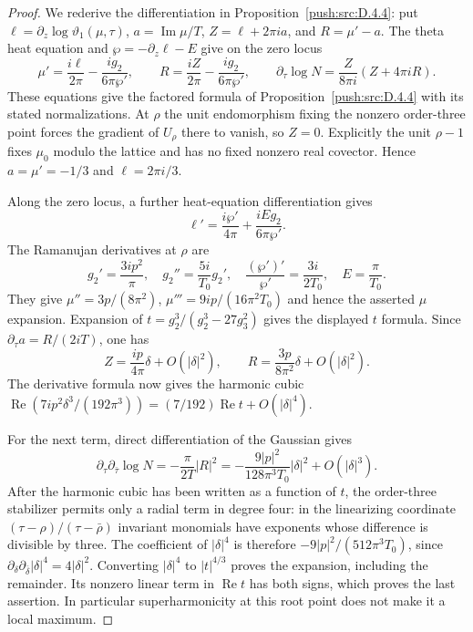 \begin{proof}
We rederive the differentiation in Proposition~\ref{push:src:D.4.4}: put
$\ell=\partial_z\log\vartheta_1(\mu,\tau)$,
$a=\operatorname{Im}\mu/T$, $Z=\ell+2\pi ia$, and
$R=\mu'-a$. The theta heat equation and
$\wp=-\partial_z\ell-E$ give on the zero locus
\[
 \mu'=\frac{i\ell}{2\pi}-\frac{ig_2}{6\pi\wp'},\qquad
 R=\frac{iZ}{2\pi}-\frac{ig_2}{6\pi\wp'},\qquad
 \partial_\tau\log N=\frac{Z}{8\pi i}(Z+4\pi iR).
\]
These equations give the factored formula of Proposition~\ref{push:src:D.4.4}
with its stated normalizations. At $\rho$ the unit endomorphism fixing the
nonzero order-three point forces the gradient of $U_\rho$ there to
vanish, so $Z=0$. Explicitly the unit $\rho-1$ fixes $\mu_0$ modulo
the lattice and has no fixed nonzero real covector. Hence
$a=\mu'=-1/3$ and $\ell=2\pi i/3$.

Along the zero locus, a further heat-equation differentiation gives
\[
 \ell'=\frac{i\wp'}{4\pi}+\frac{iEg_2}{6\pi\wp'}.
\]
The Ramanujan derivatives at $\rho$ are
\[
 g_2'=\frac{3ip^2}{\pi},\quad
 g_2''=\frac{5i}{T_0}g_2',\quad
 \frac{(\wp')'}{\wp'}=\frac{3i}{2T_0},\quad E=\frac\pi{T_0}.
\]
They give $\mu''=3p/(8\pi^2)$,
$\mu'''=9ip/(16\pi^2T_0)$ and hence the asserted $\mu$ expansion.
Expansion of $t=g_2^3/(g_2^3-27g_3^2)$ gives the displayed $t$
formula. Since $\partial_\tau a=R/(2iT)$, one has
\[
 Z=\frac{ip}{4\pi}\delta+O(|\delta|^2),\qquad
 R=\frac{3p}{8\pi^2}\delta+O(|\delta|^2).
\]
The derivative formula now gives the harmonic cubic
$\operatorname{Re}(7ip^2\delta^3/(192\pi^3))=(7/192)
\operatorname{Re}t+O(|\delta|^4)$.

For the next term, direct differentiation of the Gaussian gives
\[
 \partial_\tau\partial_{\bar\tau}\log N
       =-\frac\pi{2T}|R|^2
       =-\frac{9|p|^2}{128\pi^3T_0}|\delta|^2+O(|\delta|^3).
\]
After the harmonic cubic has been written as a function of $t$, the
order-three stabilizer permits only a radial term in degree four:
in the linearizing coordinate
$(\tau-\rho)/(\tau-\bar\rho)$ invariant monomials have exponents
whose difference is divisible by three. The coefficient of
$|\delta|^4$ is therefore $-9|p|^2/(512\pi^3T_0)$, since
$\partial_\delta\partial_{\bar\delta}|\delta|^4=4|\delta|^2$.
Converting $|\delta|^4$ to $|t|^{4/3}$ proves the expansion, including
the remainder. Its nonzero linear term in $\operatorname{Re}t$
has both signs, which proves the last assertion. In particular
superharmonicity at this root point does not make it a local maximum.
\end{proof}



